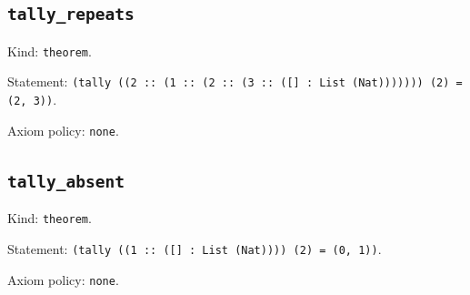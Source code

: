 \documentclass[11pt]{article}
\begin{document}
\subsection*{\texttt{tally\_repeats}}
\noindent Kind: \texttt{theorem}.\par
\noindent Statement: \texttt{(tally ((2 :: (1 :: (2 :: (3 :: ([] : List (Nat))))))) (2) = (2, 3))}.\par
\noindent Axiom policy: \texttt{none}.\par
\subsection*{\texttt{tally\_absent}}
\noindent Kind: \texttt{theorem}.\par
\noindent Statement: \texttt{(tally ((1 :: ([] : List (Nat)))) (2) = (0, 1))}.\par
\noindent Axiom policy: \texttt{none}.\par
\end{document}
